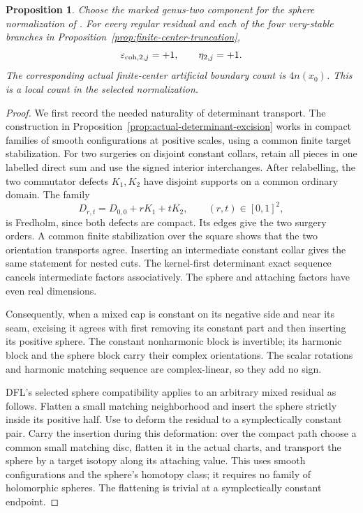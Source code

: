 \documentclass[11pt]{amsart}
\newtheorem{proposition}[theorem]{Proposition}
\theoremstyle{definition}
\theoremstyle{remark}
\theoremstyle{plain}
\begin{document}
\begin{proposition}\label{prop:genus-two-coherent-sign}
Choose the marked genus-two component for the sphere
normalization of \cite[Remark~4.76]{DaeFukLip21a}.
For every regular residual and each of the four
very-stable branches in
Proposition~\ref{prop:finite-center-truncation},
\begin{equation}\label{eq:genus-two-evaluated-physical-signs}
             \varepsilon_{{\rm coh},2,j}=+1,\qquad
                              \eta_{2,j}=+1.
\end{equation}
The corresponding actual finite-center artificial
boundary count is $4n(x_0)$.
This is a local count in the selected normalization.
\end{proposition}

\begin{proof}
We first record the needed naturality of determinant
transport. The construction in
Proposition~\ref{prop:actual-determinant-excision}
works in compact families of smooth configurations
at positive scales, using a common finite target
stabilization. For two surgeries on disjoint constant
collars, retain all pieces in one labelled direct
sum and use the signed interior interchanges.
After relabelling, the two commutator defects
$K_1,K_2$ have disjoint supports on a common
ordinary domain. The family
\[
                         D_{r,t}=D_{0,0}+rK_1+tK_2,
                                  \qquad (r,t)\in[0,1]^2,
\]
is Fredholm, since both defects are compact.
Its edges give the two surgery orders. A common
finite stabilization over the square shows that
the two orientation transports agree. Inserting
an intermediate constant collar gives the same
statement for nested cuts. The kernel-first
determinant exact sequence cancels intermediate
factors associatively. The sphere and attaching
factors have even real dimensions.

Consequently, when a mixed cap is constant on
its negative side and near its seam, excising it
agrees with first removing its constant part and
then inserting its positive sphere. The constant
nonharmonic block is invertible; its harmonic
block and the sphere block carry their complex
orientations. The scalar rotations and harmonic
matching sequence are complex-linear, so they
add no sign.

DFL's selected sphere compatibility applies to
an arbitrary mixed residual as follows. Flatten
a small matching neighborhood and insert the
sphere strictly inside its positive half.
Use \cite[Lemma~4.64]{DaeFukLip21a} to deform
the residual to a symplectically constant pair.
Carry the insertion during this deformation:
over the compact path choose a common small
matching disc, flatten it in the actual charts,
and transport the sphere by a target isotopy
along its attaching value. This uses smooth
configurations and the sphere's homotopy class;
it requires no family of holomorphic spheres.
The flattening is trivial at a symplectically
constant endpoint.


\end{proof}
\end{document}
